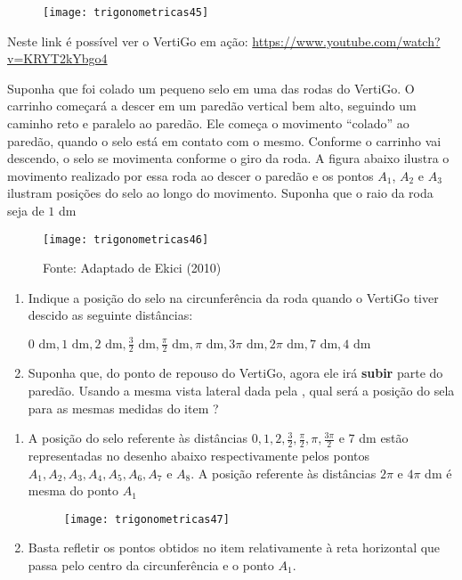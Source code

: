 \documentclass[10 pt,usenames,dvipsnames, oneside]{article}
\begin{document}
\begin{figure}[H]
\centering

\texttt{[image: trigonometricas45]}
\end{figure}

Neste link é possível ver o VertiGo em ação: \url{https://www.youtube.com/watch?v=KRYT2kYbgo4}


Suponha que foi colado um pequeno selo em uma das rodas do VertiGo. O carrinho começará a descer em um paredão vertical bem alto, seguindo um caminho reto e paralelo ao paredão. Ele começa o movimento “colado”{} ao paredão, quando o selo está em contato com o mesmo. Conforme o carrinho vai descendo, o selo se movimenta conforme o giro da roda. A figura abaixo ilustra o movimento realizado por essa roda ao descer o paredão e os pontos $A_1$, $A_2$ e $A_3$ ilustram posições do selo ao longo do movimento. Suponha que o raio da roda seja de $1$ dm

\begin{figure}[H]
\centering

\texttt{[image: trigonometricas46]}
\caption{Fonte: Adaptado de Ekici (2010)}
\label{trigonometrica46}
\end{figure}

\begin{enumerate}
\item Indique a posição do selo na circunferência da roda quando o VertiGo tiver descido as seguinte distâncias:

$0\text{ dm}, 1\text{ dm}, 2\text{ dm}, \frac{3}{2}\text{ dm}, \frac{\pi}{2}\text{ dm}, \pi\text{ dm}, 3\pi\text{ dm}, 2\pi\text{ dm}, 7\text{ dm}, 4\text{ dm}$
\item Suponha que, do ponto de repouso do VertiGo, agora ele irá \textbf{subir} parte do paredão. Usando a mesma vista lateral dada pela , qual será a posição do sela para as mesmas medidas do item ?
\end{enumerate}

\ifdefined\prof
\begin{solucao}

\begin{enumerate}
 \item A posição do selo referente às distâncias $0, 1, 2, \frac{3}{2}, \frac{\pi}{2}, \pi, \frac{3\pi}{2}$ e $7$ dm estão representadas  no desenho abaixo respectivamente pelos pontos $A_1, A_2, A_3, A_4, A_5, A_6, A_7\text{ e }A_8$. A posição referente às distâncias $2\pi$ e $4\pi$ dm é mesma do ponto $A_1$

 \begin{figure}[H]
 \centering
 
 \texttt{[image: trigonometricas47]}
 \end{figure}
 \item Basta refletir os pontos obtidos no item  relativamente à reta horizontal que passa pelo centro da circunferência e o ponto $A_1$.
 \end{enumerate}

\end{solucao}
\fi
\end{document}
